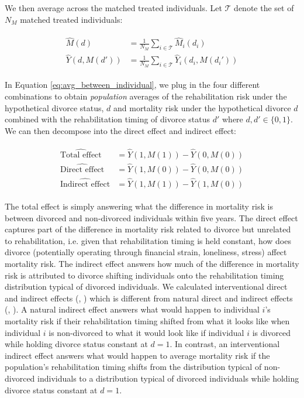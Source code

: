 \documentclass[a4paper,12pt]{article}
\theoremstyle{plain}
\theoremstyle{definition}
\theoremstyle{TheoremNum}
\theoremstyle{CorollaryNum}
\theoremstyle{PropositionNum}
\theoremstyle{TheoremNum}
\begin{document}
We then average across the matched treated individuals. Let $\mathcal{T}$ denote the set of $N_M$ matched treated individuals:

\begin{align}
\begin{split}
\hat{M}(d) & = \frac{1}{N_M} \sum_{i \in \mathcal{T}} \hat{M}_i(d_i) \\
\hat{Y}(d, M(d')) & = \frac{1}{N_M} \sum_{i \in \mathcal{T}} \hat{Y}_i(d_i,M(d_i'))
\end{split}
\tag{8}\label{eq:avg_between_individual}
\end{align}

In Equation \ref{eq:avg_between_individual}, we plug in the four different combinations to obtain \textit{population} averages of the rehabilitation risk under the hypothetical divorce status, $d$ and mortality risk under the hypothetical divorce $d$ combined with the rehabilitation timing of divorce status $d'$ where $d, d' \in \{0,1\}$. We can then decompose into the direct effect and indirect effect:

\begin{align}
\begin{split}
\widehat{\text{Total effect}}&= \hat{Y}(1,M(1))-\hat{Y}(0,M(0)) \\
\widehat{\text{Direct effect}}&= \hat{Y}(1,M(0))-\hat{Y}(0,M(0)) \\
\widehat{\text{Indirect effect}}&= \hat{Y}(1,M(1))-\hat{Y}(1,M(0))
\end{split}
\tag{9}\label{eq:decomposition}
\end{align}

The total effect is simply answering what the difference in mortality risk is between divorced and non-divorced individuals within five years. The direct effect captures part of the difference in mortality risk related to divorce but unrelated to rehabilitation, i.e. given that rehabilitation timing is held constant, how does divorce (potentially operating through financial strain, loneliness, stress) affect mortality risk. The indirect effect answers how much of the difference in mortality risk is attributed to divorce shifting individuals onto the rehabilitation timing distribution typical of divorced individuals. We calculated interventional direct and indirect effects (\citeauthor*{vanderweele2014effect}, \citeyear{vanderweele2014effect}) which is different from natural direct and indirect effects  (\citeauthor{pearl2001direct}, \citeyear{pearl2001direct}). A natural indirect effect answers what would happen to individual $i$'s mortality risk if their rehabilitation timing shifted from what it looks like when individual $i$ is non-divorced to what it would look like if individual $i$ is divorced while holding divorce status constant at $d=1$. In contrast, an interventional indirect effect answers what would happen to average mortality risk if the population's rehabilitation timing shifts from the distribution typical of non-divorced individuals to a distribution typical of divorced individuals while holding divorce status constant at $d=1$. 
\end{document}
